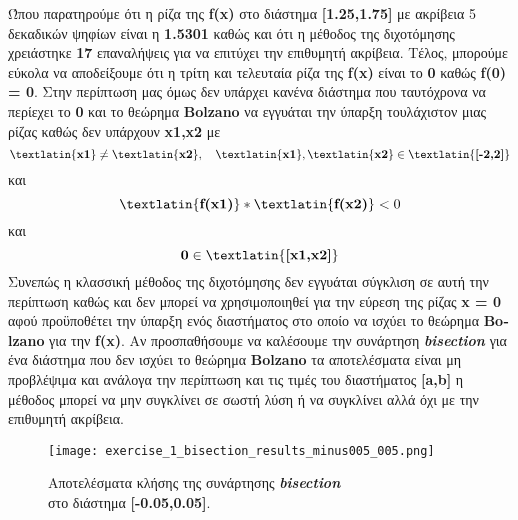 \documentclass[First Project.tex]{subfiles}
\begin{document}
Ώπου παρατηρούμε ότι η ρίζα της \textlatin{\textbf{f(x)}} στο διάστημα \textlatin{\textbf{[1.25,1.75]}} με ακρίβεια 5 δεκαδικών ψηφίων 
είναι η \textbf{1.5301} καθώς και ότι η μέθοδος της διχοτόμησης χρειάστηκε \textbf{17} επαναλήψεις για να επιτύχει την επιθυμητή ακρίβεια. 
Τέλος, μπορούμε εύκολα να αποδείξουμε ότι η τρίτη και τελευταία ρίζα της \textlatin{\textbf{f(x)}} είναι το \textbf{0} καθώς 
\textlatin{\textbf{f(0) = 0}}. Στην περίπτωση μας όμως δεν υπάρχει κανένα διάστημα που ταυτόχρονα να περίεχει το \textbf{0} και το θεώρημα
\textlatin{\textbf{Bolzano}} να εγγυάται την ύπαρξη τουλάχιστον μιας ρίζας καθώς δεν υπάρχουν \textbf{\textlatin{x1,x2}} με 
\begin{equation*}
    \textlatin{\textbf{x1}} \neq  \textlatin{\textbf{x2}}, \quad \textlatin{\textbf{x1}},\textlatin{\textbf{x2}} \in \textlatin{\textbf{[-2,2]}} 
\end{equation*}
και
\begin{equation*}
    \textlatin{\textbf{f(x1)}} * \textlatin{\textbf{f(x2)}} < 0 
\end{equation*}
και
\begin{equation*}
    \textbf{0} \in  \textlatin{\textbf{[x1,x2]}} 
\end{equation*}
Συνεπώς η κλασσική μέθοδος της διχοτόμησης δεν εγγυάται σύγκλιση σε αυτή την περίπτωση καθώς και δεν μπορεί να χρησιμοποιηθεί για την εύρεση 
της ρίζας \textbf{\textlatin{x = 0}} αφού προϋποθέτει την ύπαρξη ενός διαστήματος στο οποίο να ισχύει το θεώρημα \textlatin{\textbf{Bolzano}} 
για την \textlatin{\textbf{f(x)}}. Αν προσπαθήσουμε να καλέσουμε την συνάρτηση \textit{\textlatin{\textbf{bisection}}} για ένα διάστημα που
δεν ισχύει το θεώρημα \textlatin{\textbf{Bolzano}} τα αποτελέσματα είναι μη προβλέψιμα και ανάλογα την περίπτωση και τις τιμές του 
διαστήματος \textlatin{\textbf{[a,b]}} η μέθοδος μπορεί να μην συγκλίνει σε σωστή λύση ή να συγκλίνει αλλά όχι με την επιθυμητή ακρίβεια.

\begin{figure}[h!]
    \centering
    \captionsetup{justification=centering}
    \begin{center}
        \texttt{[image: exercise\_1\_bisection\_results\_minus005\_005.png]}    
        \caption{ Αποτελέσματα κλήσης της συνάρτησης \textit{\textlatin{\textbf{bisection}}} \\ στο διάστημα \textlatin{\textbf{[-0.05,0.05]}}. }
    \end{center}
\end{figure}
\end{document}
